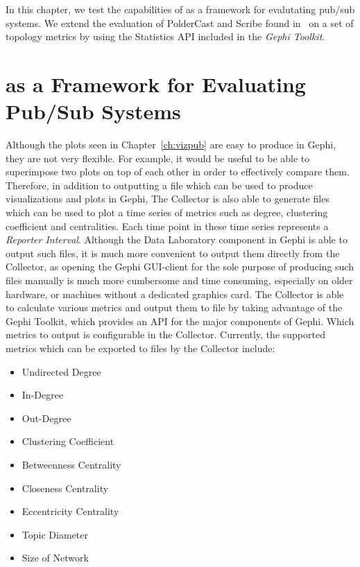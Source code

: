 In this chapter, we test the capabilities of  \demo{} as a framework for
evalutating pub/sub systems. We extend the evaluation of PolderCast and
Scribe found in~\cite{Setty:2012} on a set of topology metrics by using
the Statistics API included in the \emph{Gephi Toolkit}.

\section{\demo as a Framework for Evaluating Pub/Sub Systems}
\label{sec:viz_eval}

Although the plots seen in Chapter~\ref{ch:vizpub} are easy to produce
in Gephi, they are not very flexible. For example, it would be useful to
be able to superimpose two plots on top of each other in order to
effectively compare them. Therefore, in addition to outputting a \gexf
file which can be used to produce visualizations and plots in Gephi, The
Collector is also able to generate \csv files which can be used to plot
a time series of metrics such as degree, clustering coefficient and
centralities. Each time point in these time series represents a
\emph{Reporter Interval}. Although the Data Laboratory component in
Gephi is able to output such \csv files, it is much more convenient to
output them directly from the Collector, as opening the Gephi GUI-client
for the sole purpose of producing such files manually is much more
cumbersome and time consuming, especially on older hardware, or machines
without a dedicated graphics card. The Collector is able to calculate
various metrics and output them to file by taking advantage of the Gephi
Toolkit, which provides an API for the major components of Gephi. Which
metrics to output is configurable in the Collector. Currently, the
supported metrics which can be exported to \csv files by the Collector
include:

\begin{itemize}
    \item Undirected Degree
    \item In-Degree
    \item Out-Degree
    \item Clustering Coefficient
    \item Betweenness Centrality
    \item Closeness Centrality
    \item Eccentricity Centrality
    \item Topic Diameter
    \item Size of Network
\end{itemize}

